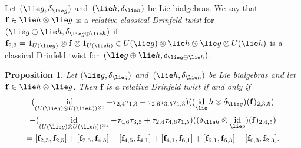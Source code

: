 \documentclass[12pt, reqno]{amsart}
\newtheorem{proposition}[theorem]{Proposition}
\theoremstyle{definition}
\numberwithin{equation}{section}
\newcommand{\tensor}{\otimes}
\DeclareMathOperator{\id}{id}
\begin{document}
Let $(\lie g,\delta_{\lie g})$ and~$(\lie h,\delta_{\lie h})$ be Lie bialgebras. 
We say that $\mathbf f\in \lie h\tensor\lie g$
is a {\em relative classical Drinfeld twist} for $(\lie g\oplus\lie h,\delta_{\lie g\oplus\lie h})$
if $\mathbf f_{2,3}=1_{U(\lie g)}\tensor 
\mathbf f\tensor 1_{U(\lie h)}\in  
U(\lie g)\tensor \lie h\tensor \lie g\tensor U(\lie h)$ 
is a classical Drinfeld twist for~$(\lie g\oplus\lie h,\delta_{\lie g\oplus\lie h})$.
\begin{proposition}\label{prop:rel class Drinfeld}
Let $(\lie g,\delta_{\lie g})$ and~$(\lie h,\delta_{\lie h})$ be Lie bialgebras and let
$\mathbf f\in\lie h\tensor\lie g$. Then $\mathbf f$ is a relative 
Drinfeld twist if and only if 
\begin{multline*}
(\id_{(U(\lie g)\tensor U(\lie h))^{\tensor3}}-\tau_{2,4}\tau_{1,3}+\tau_{2,6}\tau_{3,5}\tau_{1,3})((\id_\lie h\tensor\delta_{\lie g})(\mathbf f)_{2,3,5})\\-
(\id_{(U(\lie g)\tensor U(\lie h))^{\tensor3}}-\tau_{4,6}\tau_{3,5}+\tau_{2,4}\tau_{4,6}\tau_{1,5})((\delta_{\lie h}\tensor \id_{\lie g})(\mathbf f)_{2,4,5})
\\
=[\mathbf f_{2,3},\mathbf f_{2,5}]+[\mathbf f_{2,5},\mathbf f_{4,5}]+
[\mathbf f_{4,5},\mathbf f_{4,1}]
+[\mathbf f_{4,1},\mathbf f_{6,1}]+[\mathbf f_{6,1},\mathbf f_{6,3}]
+[\mathbf f_{6,3},\mathbf f_{2,3}].
\end{multline*}
\end{proposition}
\end{document}

